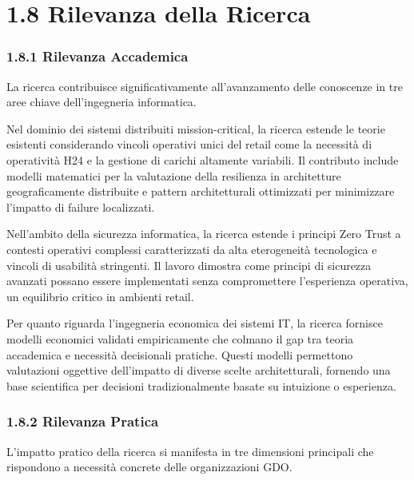 \documentclass[12pt,a4paper,oneside]{book}
\begin{document}
\section{\texorpdfstring{\textbf{1.8 Rilevanza della
Ricerca}}{1.8 Rilevanza della Ricerca}}\label{rilevanza-della-ricerca}

\subsubsection{\texorpdfstring{\textbf{1.8.1 Rilevanza
Accademica}}{1.8.1 Rilevanza Accademica}}\label{rilevanza-accademica}

La ricerca contribuisce significativamente all'avanzamento delle
conoscenze in tre aree chiave dell'ingegneria informatica.

Nel dominio dei sistemi distribuiti mission-critical, la ricerca estende
le teorie esistenti considerando vincoli operativi unici del retail come
la necessità di operatività H24 e la gestione di carichi altamente
variabili. Il contributo include modelli matematici per la valutazione
della resilienza in architetture geograficamente distribuite e pattern
architetturali ottimizzati per minimizzare l'impatto di failure
localizzati.

Nell'ambito della sicurezza informatica, la ricerca estende i principi
Zero Trust a contesti operativi complessi caratterizzati da alta
eterogeneità tecnologica e vincoli di usabilità stringenti. Il lavoro
dimostra come principi di sicurezza avanzati possano essere implementati
senza compromettere l'esperienza operativa, un equilibrio critico in
ambienti retail.

Per quanto riguarda l'ingegneria economica dei sistemi IT, la ricerca
fornisce modelli economici validati empiricamente che colmano il gap tra
teoria accademica e necessità decisionali pratiche. Questi modelli
permettono valutazioni oggettive dell'impatto di diverse scelte
architetturali, fornendo una base scientifica per decisioni
tradizionalmente basate su intuizione o esperienza.

\subsubsection{\texorpdfstring{\textbf{1.8.2 Rilevanza
Pratica}}{1.8.2 Rilevanza Pratica}}\label{rilevanza-pratica}

L'impatto pratico della ricerca si manifesta in tre dimensioni
principali che rispondono a necessità concrete delle organizzazioni GDO.
\end{document}
